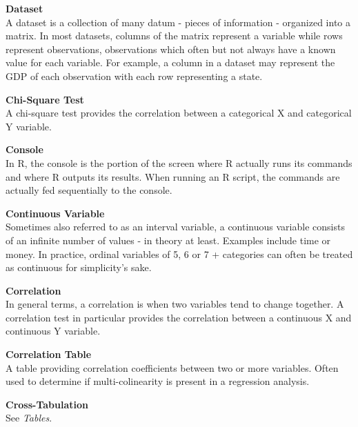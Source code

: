 \documentclass[12pt,letterpaper]{article}
\begin{document}
\textbf{Dataset}\\
A dataset is a collection of many datum - pieces of information - organized into a matrix. In most datasets, columns of the matrix represent a variable while rows represent observations, observations which often but not always have a known value for each variable. For example, a column in a dataset may represent the GDP of each observation with each row representing a state.

\vspace{1em}

\textbf{Chi-Square Test}\\
A chi-square test provides the correlation between a categorical X and categorical Y variable.

\vspace{1em}

\textbf{Console}\\
In R, the console is the portion of the screen where R actually runs its commands and where R outputs its results. When running an R script, the commands are actually fed sequentially to the console.

\vspace{1em}


\textbf{Continuous Variable}\\
Sometimes also referred to as an interval variable, a continuous variable consists of an infinite number of values - in theory at least. Examples include time or money. In practice, ordinal variables of 5, 6 or 7 + categories can often be treated as continuous for simplicity's sake.

\vspace{1em}

\textbf{Correlation}\\
In general terms, a correlation is when two variables tend to change together. A correlation test in particular provides the correlation between a continuous X and continuous Y variable.

\vspace{1em}

\textbf{Correlation Table}\\
A table providing correlation coefficients between two or more variables. Often used to determine if multi-colinearity is present in a regression analysis. 

\vspace{1em}

\textbf{Cross-Tabulation}\\
See \textit{Tables}.
\end{document}
